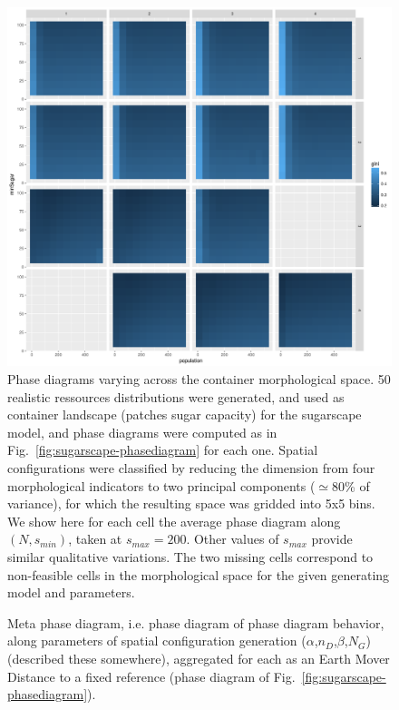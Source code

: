 \documentclass[a4paper,12pt]{article}
\begin{document}
\begin{figure}
\centering
\includegraphics[width=\textwidth]{figures/phasediagrams_pca_maxSugar200}
\caption{Phase diagrams varying across the container morphological space. 50 realistic ressources distributions were generated, and used as container landscape (patches sugar capacity) for the sugarscape model, and phase diagrams were computed as in Fig.~\ref{fig:sugarscape-phasediagram} for each one. Spatial configurations were classified by reducing the dimension from four morphological indicators to two principal components ($\simeq$80\% of variance), for which the resulting space was gridded into 5x5 bins. We show here for each cell the average phase diagram along $(N,s_{min})$, taken at $s_{max}=200$. Other values of $s_{max}$ provide similar qualitative variations. The two missing cells correspond to non-feasible cells in the morphological space for the given generating model and parameters.}
\label{fig:sugarscape-meta}
\end{figure}

\begin{figure}
\centering
%
\caption{Meta phase diagram, i.e. phase diagram of phase diagram behavior, along parameters of spatial configuration generation ($\alpha$,$n_D$,$\beta$,$N_G$) (described these somewhere), aggregated for each as an Earth Mover Distance to a fixed reference (phase diagram of Fig.~\ref{fig:sugarscape-phasediagram}).}
\label{fig:sugarscape-meta}
\end{figure}
\end{document}
